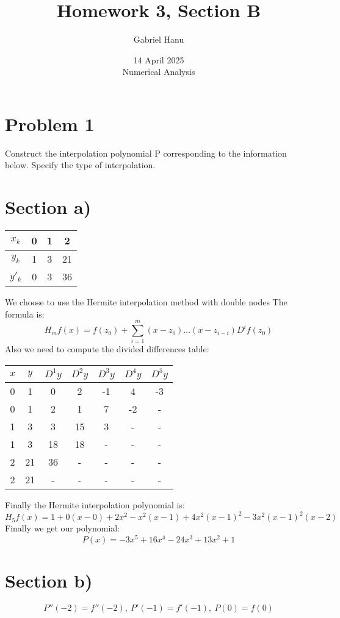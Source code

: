 \documentclass{article}
\title{Homework 3, Section B}
\author{Gabriel Hanu}
\date{14 April 2025 \\
Numerical Analysis}
\begin{document}
\maketitle

\section*{Problem 1}
Construct the interpolation polynomial P corresponding to the information below. Specify the type of interpolation.

\section*{Section a)}
\begin{center}
    \begin{tabular}{c| c c c}
        \(x_k\) & 0 & 1 & 2 \\
        \hline
        \(y_k\) & 1 & 3 & 21 \\
        \hline
        \(y'_k\) & 0 & 3 & 36 \\
    \end{tabular}
\end{center}
We choose to use the Hermite interpolation method with double nodes
The formula is:
\[
    H_mf(x) = f(z_0) + \sum_{i=1}^{m} (x - z_0) ... (x-z_{i-i}) D^if(z_0)
\]
Also we need to compute the divided differences table:
\begin{center}
    \begin{tabular}{c | c c c c c c}
        \(x\) & \(y\) & \(D^1y\) & \(D^2y\) & \(D^3y\)& \(D^4y\)& \(D^5y\)\\
        \hline
        0 & 1 & 0 & 2 & -1 & 4 & -3 \\
        0 & 1 & 2 & 1 & 7 & -2 & - \\
        1 & 3 & 3 & 15 & 3 & - & - \\
        1 & 3 & 18 & 18 & - & - & - \\
        2 & 21 & 36 & - & - & - & - \\
        2 & 21 & - & - & - & - & - \\
    \end{tabular}
\end{center}
Finally the Hermite interpolation polynomial is:
\[
    H_5f(x) = 1 + 0(x-0) + 2x^2 - x^2(x-1) + 4x^2(x-1)^2 -3x^2(x-1)^2(x-2)
\]
Finally we get our polynomial:
\[
    P(x) = -3x^5 + 16x^4 - 24x^3 + 13x^2 + 1
\]


\section*{Section b)}
\[
    P''(-2) = f''(-2), \
    P'(-1) = f'(-1), \
    P(0) = f(0)
\]
\end{document}
